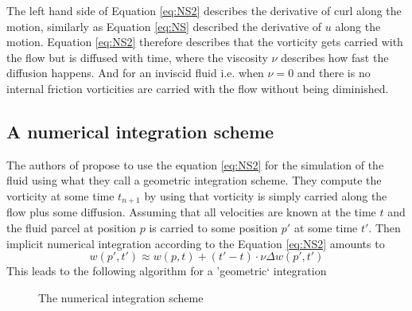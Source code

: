 The left hand side of Equation \ref{eq:NS2} describes the derivative of curl along the motion, similarly as Equation \ref{eq:NS} described the derivative of $u$ along the motion. Equation \ref{eq:NS2} therefore describes that the vorticity gets carried with the flow but is diffused with time, where the viscosity $\nu$ describes how fast the diffusion happens. And for an inviscid fluid i.e. when $\nu = 0$ and there is no internal friction vorticities are carried with the flow without being diminished. 



\subsection{A numerical integration scheme}
The authors of  propose to use the equation \ref{eq:NS2} for the simulation of the fluid using what they call a geometric integration scheme. They compute the vorticity at some time $t_{n+1}$ by using that vorticity is simply carried along the flow plus some diffusion. Assuming that all velocities are known at the time $t$ and the fluid parcel at position $p$ is carried to some position $p'$ at some time $t'$. Then implicit numerical integration according to the Equation \ref{eq:NS2} amounts to
\begin{equation}w(p',t') \approx w(p,t) + (t'-t) \cdot \nu \Delta w(p',t')\label{eq:vortDiffusion}\end{equation}
This leads to the following algorithm for a 'geometric` integration

\begin{figure}[t]
\begin{center}\end{center}
\caption{The numerical integration scheme}
\end{figure}

